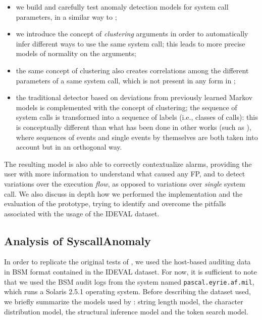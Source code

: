 \begin{itemize}
\item we build and carefully test anomaly detection models for system
  call parameters, in a similar way to \citep{libanomaly};
\item we introduce the concept of \emph{clustering} arguments in order
  to automatically infer different ways to use the same system call;
  this leads to more precise models of normality on the arguments;
\item the same concept of clustering also creates correlations among
  the different parameters of a same system call, which is not present
  in any form in
  \citep{libanomaly,rulessystemcallarguments,venkat_dataflow};
\item the traditional detector based on deviations from previously
  learned Markov models is complemented with the concept of
  clustering; the sequence of system calls is transformed into a
  sequence of labels (i.e., classes of calls): this is conceptually
  different than what has been done in other works (such as
  \citep{rulessystemcallarguments}), where sequences of events and
  single events by themselves are both taken into account but in an
  orthogonal way.
\end{itemize}

The resulting model is also able to correctly contextualize alarms,
providing the user with more information to understand what caused any
\ac{FP}, and to detect variations over the execution \emph{flow}, as
opposed to variations over \emph{single} system call. We also discuss
in depth how we performed the implementation and the evaluation of the
prototype, trying to identify and overcome the pitfalls associated
with the usage of the \ac{IDEVAL} dataset.

\subsection{Analysis of SyscallAnomaly}
\label{host:syscall:crit-libanomaly}
In order to replicate the original tests of \SyscallAnomaly, we used
the host-based auditing data in \ac{BSM} format contained
in the \ac{IDEVAL} dataset. For now, it is sufficient to
note that we used the \ac{BSM} audit logs from the system
named \texttt{pascal.eyrie.af.mil}, which runs a \textsf{Solaris}
2.5.1 operating system. Before describing the dataset used, we briefly
summarize the models used by \SyscallAnomaly: string length model, the
character distribution model, the structural inference model and the
token search model.

